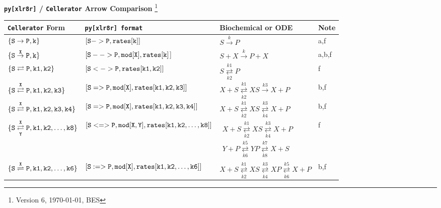 \documentclass[12pt,letterpaper,landscape]{article}
\author{B.E.Shapiro}
\begin{document}
\pagestyle{empty}

\begin{center}
{\textbf{{ \tt py[xlr8r]} / {\tt Cellerator} Arrow Comparison }\footnote{Version 6, \today, BES}}
\vspace{.25in}

\begin{tabular}{|l|l|l|l|}
\hline
\textbf{{\tt Cellerator} Form} & \textbf{\tt{py[xlr8r]} format} & \textbf{Biochemical or ODE} & \textbf{Note} \\ \hline
$\tt{\{S\to P, k\}}$ & 
$[\tt S->P, rates[k]]$ & 
$S\overset{k}{\to}P$ & a,f\\ \hline

$\tt{\{S\overset{X}{\to} P,k\}}$ & 
$[\tt S-->P, mod[X], rates[k]$] & 
$S+X\overset{k}{\to}P+X$ & a,b,f \\\hline

$\tt\{S \rightleftarrows P,k1,k2 \}$ &
$[\tt S <->P, rates[k1,k2] ] $  & 
$ S\underset{k2}{\overset{k1}  \rightleftarrows } P$ & f \\ \hline


$\tt\{S \overset{X}{\rightleftarrows} P,k1,k2,k3 \}$ &
$[\tt S=>P, mod[X], rates[k1,k2,k3] ] $ & 
$ X+S\underset{k2}{\overset{k1}  \rightleftarrows } XS \overset{k3}{\to} X+P$ & b,f
\\ \hline

$\tt\{S \overset{X}{\rightleftarrows} P,k1,k2,k3,k4 \}$ &
$[\tt S=>P, mod[X], rates[k1,k2,k3,k4] ]$ & 
$ X+S\underset{k2}{\overset{k1}  \rightleftarrows } XS \underset{k4}{ \overset{k3}{\rightleftarrows}} X+P$ & b,f \\ \hline

$\tt\{S \underset{Y}{\overset{X}{\rightleftarrows}} P,k1,k2,\dots,k8 \}$ &
$[\tt S<=>P, mod[X,Y], rates[k1,k2,\dots,k8] ]$ &
$
\begin{array}{l}
X+S\underset{k2}{\overset{k1}  \rightleftarrows } XS \underset{k4}{ \overset{k3}{\rightleftarrows}} X+P
\\
Y+P\underset{k6}{\overset{k5}  \rightleftarrows } YP \underset{k8}{ \overset{k7}{\rightleftarrows}} X+S
\end{array}
$
&f\\\hline


$\tt\{S \overset{X}{\rightleftharpoons} P,k1,k2,\dots,k6 \}$ &
$[\tt S:=>P, mod[X], rates[k1,k2,\dots,k6] ] $ & 
$ X+S\underset{k2}{\overset{k1}  \rightleftarrows } XS \underset{k4}{ \overset{k3}{\rightleftarrows} } XP \underset{k6}{\overset{k5}{\rightleftarrows}} X+P$
&b,f \\ \hline 



\end{tabular}
\end{center}
\end{document}
